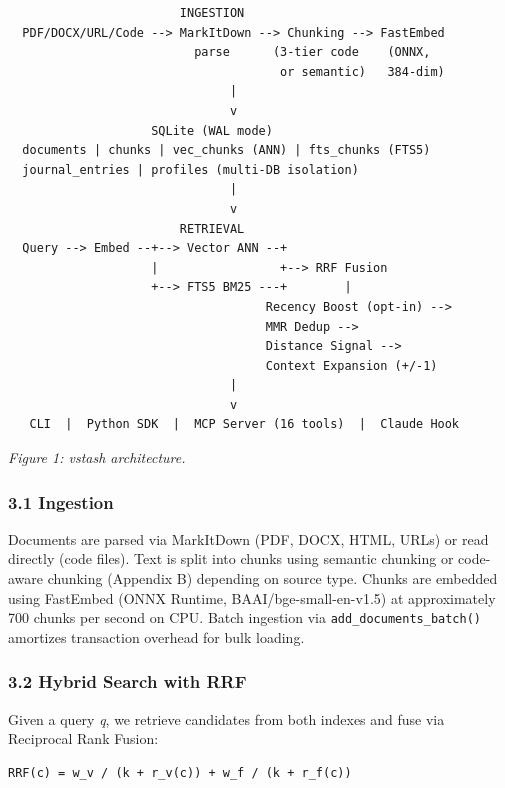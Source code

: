 \documentclass[
  11pt]{article}
\begin{document}
\begin{verbatim}
                        INGESTION
  PDF/DOCX/URL/Code --> MarkItDown --> Chunking --> FastEmbed
                          parse      (3-tier code    (ONNX,
                                      or semantic)   384-dim)
                               |
                               v
                    SQLite (WAL mode)
  documents | chunks | vec_chunks (ANN) | fts_chunks (FTS5)
  journal_entries | profiles (multi-DB isolation)
                               |
                               v
                        RETRIEVAL
  Query --> Embed --+--> Vector ANN --+
                    |                 +--> RRF Fusion
                    +--> FTS5 BM25 ---+        |
                                    Recency Boost (opt-in) -->
                                    MMR Dedup -->
                                    Distance Signal -->
                                    Context Expansion (+/-1)
                               |
                               v
   CLI  |  Python SDK  |  MCP Server (16 tools)  |  Claude Hook
\end{verbatim}

\emph{Figure 1: vstash architecture.}

\subsubsection{3.1 Ingestion}\label{ingestion}

Documents are parsed via MarkItDown (PDF, DOCX, HTML, URLs) or read directly (code files). Text is split into chunks using semantic chunking or code-aware chunking (Appendix B) depending on source type. Chunks are embedded using FastEmbed (ONNX Runtime, BAAI/bge-small-en-v1.5) at approximately 700 chunks per second on CPU. Batch ingestion via \texttt{add\_documents\_batch()} amortizes transaction overhead for bulk loading.

\subsubsection{3.2 Hybrid Search with RRF}\label{hybrid-search-with-rrf}

Given a query \emph{q}, we retrieve candidates from both indexes and fuse via Reciprocal Rank Fusion:

\begin{verbatim}
RRF(c) = w_v / (k + r_v(c)) + w_f / (k + r_f(c))
\end{verbatim}
\end{document}
